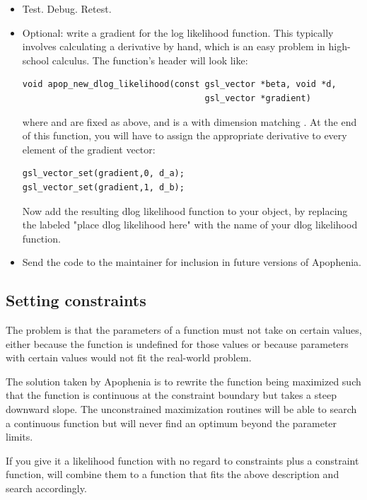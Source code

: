 \begin{itemize}
\item Test. Debug. Retest.

\item Optional: write a gradient for the log likelihood function. This
typically involves calculating a derivative by hand, which is an easy
problem in high-school calculus. The function's header will look like: 
\begin{lstlisting}
void apop_new_dlog_likelihood(const gsl_vector *beta, void *d, 
                                    gsl_vector *gradient)
\end{lstlisting}
where  and  are fixed as above, and  is a  with dimension matching . 
At the end of this function, you will have to assign the appropriate derivative to every element of the gradient vector:
\begin{lstlisting}
gsl_vector_set(gradient,0, d_a);
gsl_vector_set(gradient,1, d_b);
\end{lstlisting}
Now add the resulting dlog likelihood function to your object, by replacing the  labeled "place dlog likelihood here" with the name of your dlog likelihood function.
\item Send the code to the maintainer for inclusion in future versions of Apophenia.
\end{itemize}


\subsection{Setting
constraints}\label{constraintwriting}

The problem is that the parameters of a function must not take on
certain values, either because the function is undefined for those
values or because parameters with certain values would not fit the
real-world problem.

The solution taken by Apophenia is to rewrite the function being maximized such that the
function is continuous at the constraint boundary but takes a steep
downward slope. The unconstrained maximization routines will be able
to search a continuous function but will never find an optimum 
beyond the parameter limits.

If you give it a likelihood function with no regard to constraints plus
a constraint function,  will combine
them to a function that fits the above description and search accordingly.


